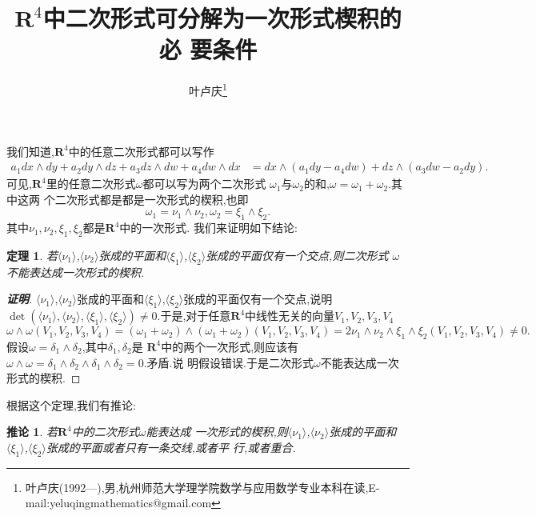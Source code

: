 \documentclass[a4paper]{article}
\newtheorem*{theo}{定理}
\newtheorem*{coro}{推论}
\newenvironment{corollary}
{\bigskip\begin{mdframed}\begin{coro}}
    {\end{coro}\end{mdframed}\bigskip}
\newenvironment{theorem}
{\bigskip\begin{mdframed}\begin{theo}}
    {\end{theo}\end{mdframed}\bigskip}
\begin{document}
\title{\huge{\bf{$\mathbf{R}^4$中二次形式可分解为一次形式楔积的必
      要条件}}} \author{\small{叶卢庆\footnote{叶卢庆(1992---),男,杭州师范大学理学院数学与应用数学专业本科在读,E-mail:yeluqingmathematics@gmail.com}}}
\maketitle
我们知道,$\mathbf{R}^4$中的任意二次形式都可以写作
\begin{align*}
a_1dx\wedge dy+a_2dy\wedge dz+a_3dz\wedge dw+a_4dw\wedge dx&=
dx\wedge (a_{1}dy-a_{4}dw)+dz\wedge (a_3dw-a_2dy).
\end{align*}
可见,$\mathbf{R}^4$里的任意二次形式$\omega$都可以写为两个二次形式
$\omega_1$与$\omega_2$的和,$\omega=\omega_1+\omega_2$.其中这两
个二次形式都是都是一次形式的楔积,也即
$$
\omega_1=\nu_1\wedge \nu_2,\omega_2=\xi_1\wedge \xi_2.
$$
其中$\nu_1,\nu_2,\xi_1,\xi_2$都是$\mathbf{R}^4$中的一次形式.
我们来证明如下结论:
\begin{theorem}
若$\langle \nu_1\rangle$,$\langle\nu_2\rangle$张成的平面和$\langle
\xi_1\rangle$,$\langle\xi_2\rangle$张成的平面仅有一个交点,则二次形式
$\omega$不能表达成一次形式的楔积.
\end{theorem}
\begin{proof}[\textbf{证明}]
  $\langle \nu_1\rangle$,$\langle\nu_2\rangle$张成的平面和$\langle
\xi_1\rangle$,$\langle\xi_2\rangle$张成的平面仅有一个交点,说明$\det
(\langle\nu_1\rangle,\langle\nu_2\rangle,\langle\xi_1\rangle,\langle\xi_2\rangle)\neq
0$.于是,对于任意$\mathbf{R}^4$中线性无关的向量$V_1,V_2,V_3,V_{4}$
$$
  \omega\wedge\omega(V_1,V_2,V_3,V_{4})=(\omega_1+\omega_2)\wedge(\omega_1+\omega_2)(V_1,V_2,V_{3},V_{4})
=2\nu_1\wedge\nu_2\wedge\xi_1\wedge\xi_2(V_1,V_2,V_3,V_{4})\neq 0.
$$
假设$\omega=\delta_1\wedge\delta_2$,其中$\delta_1,\delta_2$是
$\mathbf{R}^4$中的两个一次形式,则应该有
$\omega\wedge\omega=\delta_1\wedge \delta_2\wedge \delta_1\wedge \delta_2=0$.矛盾.说
明假设错误.于是二次形式$\omega$不能表达成一次形式的楔积.
\end{proof}
根据这个定理,我们有推论:
\begin{corollary}
若$\mathbf{R}^{4}$中的二次形式$\omega$能表达成
一次形式的楔积,则$\langle\nu_1\rangle$,$\langle\nu_2\rangle$张成的平面和
$\langle\xi_1\rangle$,$\langle\xi_2\rangle$张成的平面或者只有一条交线,或者平
行,或者重合.
\end{corollary}
\end{document}

